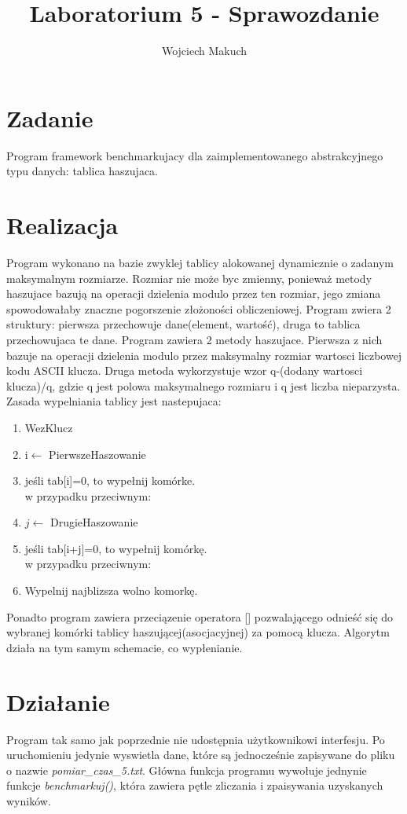 
\usepackage{graphicx}
\usepackage{float}

\title{Laboratorium 5 - Sprawozdanie}
\author{Wojciech Makuch}


\maketitle
\section{Zadanie}
Program framework benchmarkujacy dla zaimplementowanego abstrakcyjnego typu danych: tablica haszujaca.
\section{Realizacja}
Program wykonano na bazie zwyklej tablicy alokowanej dynamicznie o zadanym maksymalnym rozmiarze. Rozmiar nie może byc zmienny, ponieważ metody haszujace bazują na operacji dzielenia modulo przez ten rozmiar, jego zmiana spowodowałaby znaczne pogorszenie złożoności obliczeniowej. Program zwiera 2 struktury: pierwsza przechowuje dane(element, wartość), druga to tablica przechowujaca te dane. Program zawiera 2 metody haszujace. Pierwsza z nich bazuje na operacji dzielenia modulo przez maksymalny rozmiar wartosci liczbowej kodu ASCII klucza. Druga metoda wykorzystuje wzor q-(dodany wartosci klucza)/q, gdzie q jest polowa maksymalnego rozmiaru i q jest liczba nieparzysta. Zasada wypelniania tablicy jest nastepujaca:
\begin{enumerate}
	\item WezKlucz
	\item i$\leftarrow$ PierwszeHaszowanie
	\item jeśli tab[i]=0, to wypełnij komórke. \\
	w przypadku przeciwnym:
	\item $j\leftarrow$ DrugieHaszowanie
	\item jeśli tab[i+j]=0, to wypełnij komórkę. \\
	w przypadku przeciwnym:
	\item Wypelnij najblizsza wolno komorkę.
\end{enumerate}
Ponadto program zawiera przeciązenie operatora [] pozwalającego odnieść się do wybranej komórki tablicy haszującej(asocjacyjnej) za pomocą klucza. Algorytm działa na tym samym schemacie, co wypłenianie.
\section{Działanie}
Program tak samo jak poprzednie nie udostępnia użytkownikowi interfesju. Po uruchomieniu jedynie wyswietla dane, które są jednocześnie zapisywane do pliku o nazwie \textsl{pomiar\_czas\_5.txt}. Główna funkcja programu wywołuje jednynie funkcje \textsl{benchmarkuj()}, która zawiera pętle zliczania i zpaisywania uzyskanych wyników.

